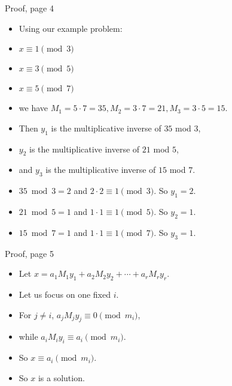 \documentclass[handout]{beamer}
\begin{document}
\begin{frame}{Proof, page 4}

\begin{itemize}
  \item Using our example problem:
  \item $x \equiv 1 \pmod 3$
  \item $x \equiv 3 \pmod 5$
  \item $x \equiv 5 \pmod 7$
  \item we have $M_1 = 5\cdot 7 = 35, M_2 = 3\cdot 7 = 21, M_3 = 3\cdot 5 = 15$.
  \item Then $y_1$ is the multiplicative inverse of $35$ mod $3$,
  \item $y_2$ is the multiplicative inverse of $21$ mod $5$,
  \item and $y_3$ is the multiplicative inverse of $15$ mod $7$.
  \item $35 \bmod 3 =2$ and $2\cdot 2 \equiv 1 \pmod 3$. So $y_1 = 2$.
  \item $21 \bmod 5 = 1$ and  $1\cdot 1 \equiv 1 \pmod 5$. So $y_2 = 1$.
  \item $15 \bmod 7 = 1$ and $1\cdot 1 \equiv 1 \pmod 7$. So $y_3 = 1$.
\end{itemize}

\end{frame}

\begin{frame}{Proof, page 5}

\begin{itemize}
  \item Let $x = a_1 M_1 y_1 + a_2 M_2 y_2 + \cdots + a_r M_r y_r$.
  \item Let us focus on one fixed $i$.
  \item For $j\not=i$, $a_j M_j y_j \equiv 0 \pmod {m_i}$,
  \item while $a_i M_i y_i \equiv a_i \pmod {m_i}$.
  \item So $x \equiv a_i \pmod {m_i}$.
  \item So $x$ is a solution.
\end{itemize}

\end{frame}
\end{document}
